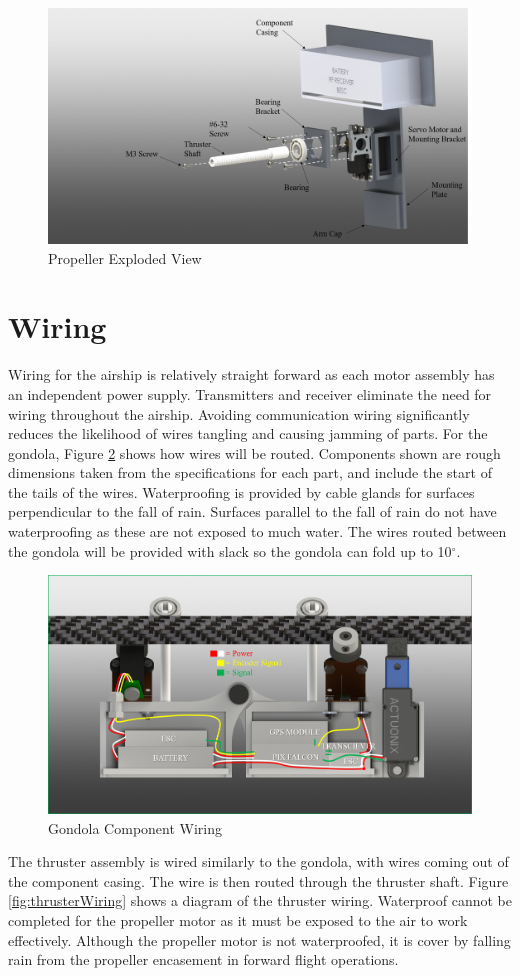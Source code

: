 \documentclass[../main.tex]{subfiles}
\begin{document}
\begin{figure}[H]
	\centering
	\includegraphics[width=.8\linewidth]{img/design/thruster/shaftAssembly.png}
	\caption{Propeller Exploded View}
	\label{fig:propAssembly}
\end{figure}

\section{Wiring}
Wiring for the airship is relatively straight forward as each motor assembly has an  independent power supply. Transmitters and receiver eliminate the need for wiring throughout the airship. Avoiding communication wiring significantly reduces the likelihood of wires tangling and causing jamming of parts. For the gondola, Figure \ref{fig:gondolaWiring} shows how wires will be routed. Components shown are rough dimensions taken from the specifications for each part, and include the start of the tails of the wires. Waterproofing is provided by cable glands for surfaces perpendicular to the fall of rain. Surfaces parallel to the fall of rain do not have waterproofing as these are not exposed to much water. The wires routed between the gondola will be provided with slack so the gondola can fold up to 10$^{\circ}$.
\\

\begin{figure}[H]
	\centering
	\includegraphics[width=.8\linewidth]{img/design/gondola/gondolaWiring.png}
	\caption{Gondola Component Wiring}
	\label{fig:gondolaWiring}
\end{figure}

The thruster assembly is wired similarly to the gondola, with wires coming out of the component casing. The wire is then routed through the thruster shaft. Figure \ref{fig:thrusterWiring} shows a diagram of the thruster wiring. Waterproof cannot be completed for the propeller motor as it must be exposed to the air to work effectively. Although the propeller motor is not waterproofed, it is cover by falling rain from the propeller encasement in forward flight operations.
\end{document}
